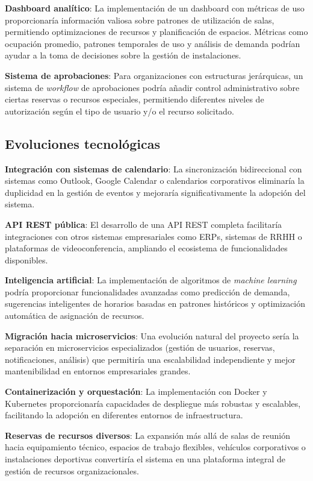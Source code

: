 \textbf{Dashboard analítico}: La implementación de un dashboard con métricas de uso proporcionaría información valiosa sobre patrones de utilización de salas, permitiendo optimizaciones de recursos y planificación de espacios. Métricas como ocupación promedio, patrones temporales de uso y análisis de demanda podrían ayudar a la toma de decisiones sobre la gestión de instalaciones.

\textbf{Sistema de aprobaciones}: Para organizaciones con estructuras jerárquicas, un sistema de \emph{workflow} de aprobaciones podría añadir control administrativo sobre ciertas reservas o recursos especiales, permitiendo diferentes niveles de autorización según el tipo de usuario y/o el recurso solicitado.

\subsection{Evoluciones tecnológicas}\label{evoluciones-tecnologicas}
\textbf{Integración con sistemas de calendario}: La sincronización bidireccional con sistemas como Outlook, Google Calendar o calendarios corporativos eliminaría la duplicidad en la gestión de eventos y mejoraría significativamente la adopción del sistema.

\textbf{API REST pública}: El desarrollo de una API REST completa facilitaría integraciones con otros sistemas empresariales como ERPs, sistemas de RRHH o plataformas de videoconferencia, ampliando el ecosistema de funcionalidades disponibles.

\textbf{Inteligencia artificial}: La implementación de algoritmos de \emph{machine learning} podría proporcionar funcionalidades avanzadas como predicción de demanda, sugerencias inteligentes de horarios basadas en patrones históricos y optimización automática de asignación de recursos.

\textbf{Migración hacia microservicios}: Una evolución natural del proyecto sería la separación en microservicios especializados (gestión de usuarios, reservas, notificaciones, análisis) que permitiría una escalabilidad independiente y mejor mantenibilidad en entornos empresariales grandes.

\textbf{Containerización y orquestación}: La implementación con Docker y Kubernetes proporcionaría capacidades de despliegue más robustas y escalables, facilitando la adopción en diferentes entornos de infraestructura.

\textbf{Reservas de recursos diversos}: La expansión más allá de salas de reunión hacia equipamiento técnico, espacios de trabajo flexibles, vehículos corporativos o instalaciones deportivas convertiría el sistema en una plataforma integral de gestión de recursos organizacionales.

